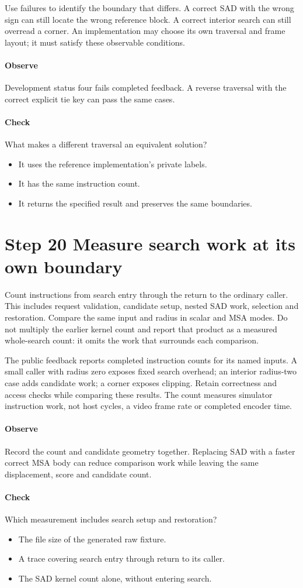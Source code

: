 Use failures to identify the boundary that differs. A correct SAD with the wrong
sign can still locate the wrong reference block. A correct interior search can
still overread a corner. An implementation may choose its own traversal and
frame layout; it must satisfy these observable conditions.

\paragraph{Observe} Development status four fails completed feedback. A reverse
traversal with the correct explicit tie key can pass the same cases.
\paragraph{Check} What makes a different traversal an equivalent solution?
\begin{itemize}
  \item[A.] It uses the reference implementation's private labels.
  \item[B.] It has the same instruction count.
  \item[C.] It returns the specified result and preserves the same boundaries.
\end{itemize}

\section{Step 20 Measure search work at its own boundary}\label{h263-motion-s10}
Count instructions from search entry through the return to the ordinary caller.
This includes request validation, candidate setup, nested SAD work, selection
and restoration. Compare the same input and radius in scalar and MSA modes.
Do not multiply the earlier kernel count and report that product as a measured
whole-search count: it omits the work that surrounds each comparison.

The public feedback reports completed instruction counts for its named inputs.
A small caller with radius zero exposes fixed search overhead; an interior
radius-two case adds candidate work; a corner exposes clipping. Retain correctness
and access checks while comparing these results. The count measures simulator
instruction work, not host cycles, a video frame rate or completed encoder time.

\paragraph{Observe} Record the count and candidate geometry together. Replacing
SAD with a faster correct MSA body can reduce comparison work while leaving the
same displacement, score and candidate count.
\paragraph{Check} Which measurement includes search setup and restoration?
\begin{itemize}
  \item[A.] The file size of the generated raw fixture.
  \item[B.] A trace covering search entry through return to its caller.
  \item[C.] The SAD kernel count alone, without entering search.
\end{itemize}
